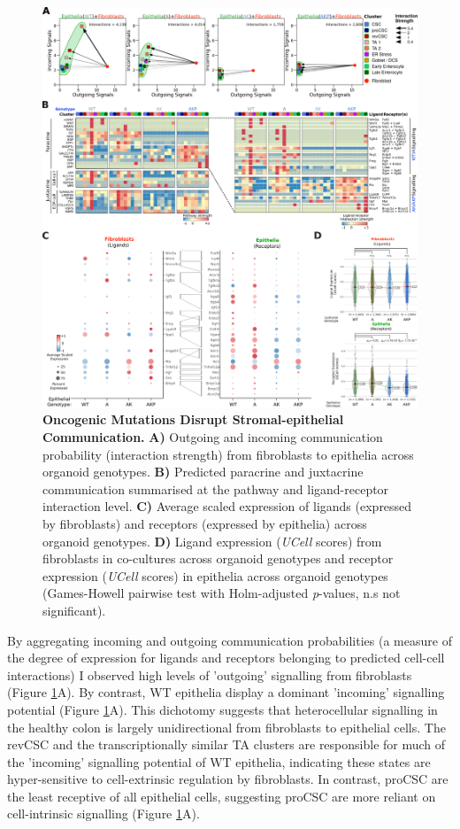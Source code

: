 \begin{figure}
    \centering
    \includegraphics{04seq/figs/4SEQ_CC.png}
    \caption{\textbf{Oncogenic Mutations Disrupt Stromal-epithelial Communication.} \textbf{A)} Outgoing and incoming communication probability (interaction strength) from fibroblasts to epithelia across organoid genotypes. \textbf{B)} Predicted paracrine and juxtacrine communication summarised at the pathway and ligand-receptor interaction level. \textbf{C)} Average scaled expression of ligands (expressed by fibroblasts) and receptors (expressed by epithelia) across organoid genotypes. \textbf{D)} Ligand expression (\textit{UCell} scores) from fibroblasts in co-cultures across organoid genotypes and receptor expression (\textit{UCell} scores) in epithelia across organoid genotypes (Games-Howell pairwise test with Holm-adjusted \textit{p}-values, n.s not significant).}
    \label{fig:4cc}
\end{figure}

By aggregating incoming and outgoing communication probabilities (a measure of the degree of expression for ligands and receptors belonging to predicted cell-cell interactions) I observed high levels of 'outgoing' signalling from fibroblasts (Figure \ref{fig:4cc}A). By contrast, WT epithelia display a dominant 'incoming' signalling potential (Figure \ref{fig:4cc}A). This dichotomy suggests that heterocellular signalling in the healthy colon is largely unidirectional from fibroblasts to epithelial cells. The revCSC and the transcriptionally similar TA clusters are responsible for much of the 'incoming' signalling potential of WT epithelia, indicating these states are hyper-sensitive to cell-extrinsic regulation by fibroblasts. In contrast, proCSC are the least receptive of all epithelial cells, suggesting proCSC are more reliant on cell-intrinsic signalling (Figure \ref{fig:4cc}A). 

